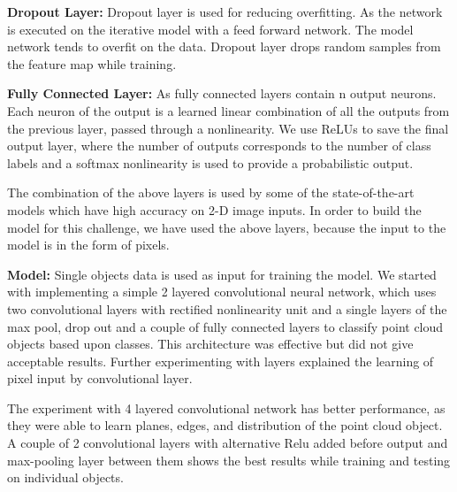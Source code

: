 \textbf{Dropout Layer:}
Dropout layer is used for reducing overfitting. As the network is executed on the iterative model with a feed forward network.
The model network tends to overfit on the data. Dropout layer drops random samples from the feature
map while training.

\textbf{Fully Connected Layer:}
As fully connected layers contain n output neurons. Each neuron of the output is a learned linear
combination of all the outputs from the previous layer, passed through a nonlinearity.
We use ReLUs to save the final output layer, where the number of outputs corresponds
to the number of class labels and a softmax nonlinearity is used to provide a probabilistic output.



The combination of the above layers is used by some of the state-of-the-art models which have high accuracy on 2-D image inputs.
In order to build the model for this challenge, we have used the above layers, because the input to the model is in the form of pixels.

\textbf{Model:}
Single objects data is used as input for training the model. We started with implementing a simple 2 layered convolutional neural network,
which uses two convolutional layers with rectified nonlinearity unit and a single layers of the max pool,
drop out and a couple of fully connected layers to classify point cloud objects based upon classes.
This architecture was effective but did not give acceptable results. Further experimenting with layers explained the learning of pixel input by convolutional layer.

The experiment with 4 layered convolutional network has better performance, as they were able to learn planes, edges, and distribution of the point cloud object.
A couple of 2 convolutional layers with alternative Relu added before output and max-pooling layer between them shows the best results while training and testing on individual objects.

